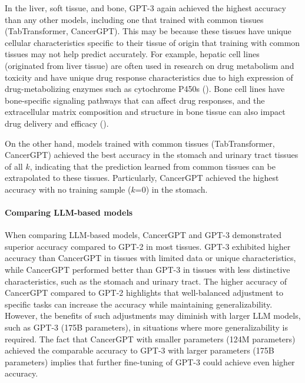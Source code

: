 {In the liver, soft tissue, and bone, GPT-3 again achieved the highest accuracy than any other models, including one that trained with common tissues (TabTransformer, CancerGPT). This may be because these tissues have unique cellular characteristics specific to their tissue of origin that training with common tissues may not help predict accurately. For example, hepatic cell lines (originated from liver tissue) are often used in research on drug metabolism and toxicity and have unique drug response characteristics due to high expression of drug-metabolizing enzymes such as cytochrome P450s (\cite{guo_similarities_2011}). Bone cell lines have bone-specific signaling pathways that can affect drug responses, and the extracellular matrix composition and structure in bone tissue can also impact drug delivery and efficacy (\cite{lin_bone_2020}). 

On the other hand, models trained with common tissues (TabTransformer, CancerGPT) achieved the best accuracy in the stomach and urinary tract tissues of all $k$, indicating that the prediction learned from common tissues can be extrapolated to these tissues. Particularly, CancerGPT achieved the highest accuracy with no training sample ($k$=0) in the stomach.  

\paragraph{Comparing LLM-based models}
When comparing LLM-based models, CancerGPT and GPT-3 demonstrated superior accuracy compared to GPT-2 in most tissues. GPT-3 exhibited higher accuracy than CancerGPT in tissues with limited data or unique characteristics, while CancerGPT performed better than GPT-3 in tissues with less distinctive characteristics, such as the stomach and urinary tract. The higher accuracy of CancerGPT compared to GPT-2 highlights that well-balanced adjustment to specific tasks can increase the accuracy while maintaining generalizability. However, the benefits of such adjustments may diminish with larger LLM models, such as GPT-3 (175B parameters), in situations where more generalizability is required.  The fact that CancerGPT with smaller parameters (124M parameters) achieved the comparable accuracy to GPT-3 with larger parameters (175B parameters) implies that further fine-tuning of GPT-3 could achieve even higher accuracy. 



}
